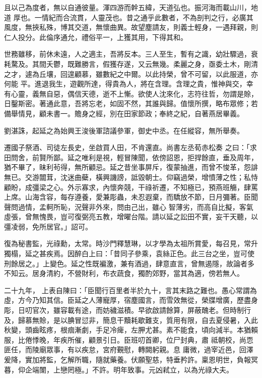 \begin{pinyinscope}
 且以己為度者，無以自通彼量。渾四游而幹五緯，天道弘也。振河海而載山川，地道
 厚也。一情紀而合流貫，人靈茂也。昔之通乎此數者，不為剖判之行，必廣其風度，無挾私殊，博其交道，無懷曲異。故望塵請友，則義士輕身，一遇拜親，則仁人投分。此倫序通允，禮俗平一，上獲其用，下得其和。



 世務雖移，前休未遠，人之適主，吾將反本。三人至生，暫有之識，幼壯驟過，衰耗騖及。其間夭鬱，既難勝言，假獲存遂，又云無幾。柔麗之身，亟委土木，剛清之才，遽為丘壤，回遑顧慕，雖數紀之中爾。以此持榮，曾不可留，以此服道，亦何能
 平。進退我生，遊觀所達，得貴為人，將在含理。含理之貴，惟神與交，幸有心靈，義無自惡，偶信天德，逝不上慚。欲使人沈來化，志符往哲，勿謂是賒，日鑿斯密。著通此意，吾將忘老，如固不然，其誰與歸。值懷所撰，略布眾修；若備舉情見，顧未書一。贍身之經，別在田家節政；奉終之紀，自著燕居畢義。



 劉湛誅，起延之為始興王浚後軍諮議參軍，御史中丞。在任縱容，無所舉奏。



 遷國子祭酒、司徒左長史，坐啟買人田，不肯還直。尚書左丞荀赤松奏
 之曰：「求田問舍，前賢所鄙。延之唯利是視，輕冒陳聞，依傍詔恩，拒捍餘直，垂及周年，猶不畢了，昧利茍得，無所顧忌。延之昔坐事屏斥，復蒙抽進，而曾不悛革，怨誹無已。交游闒茸，沈迷曲蘗，橫興譏謗，詆毀朝士。仰竊過榮，增憤薄之性；私恃顧盼，成彊梁之心。外示寡求，內懷奔競，干祿祈遷，不知極已，預燕班觴，肆罵上席。山海含容，每存遵養，愛兼彫蟲，未忍遐棄，而驕放不節，日月彌著。臣聞聲問過情，孟軻所恥，況聲非外來，問由己出，雖心
 智薄劣，而高自比擬，客氣虛張，曾無愧畏，豈可復弼亮五教，增曜台階。請以延之訟田不實，妄干天聽，以彊凌弱，免所居官。」詔可。



 復為秘書監，光祿勳，太常。時沙門釋慧琳，以才學為太祖所賞愛，每召見，常升獨榻，延之甚疾焉。因醉白上曰：「昔同子參乘，袁絲正色。此三台之坐，豈可使刑餘居之。」上變色。延之性既褊激，兼有酒過，肆意直言，曾無遏隱，故論者多不知云。居身清約，不營財利，布衣蔬食，獨酌郊野，當其為適，傍若無人。


二十九年，
 上表自陳曰：「臣聞行百里者半於九十，言其末路之難也。愚心常謂為虛，方今乃知其信。臣延之人薄寵厚，宿塵國言，而雪效無從，榮牒增廣，歷盡身彫，日叨官次，雖容載有途，而妨穢滋積。早欲啟請餘算，屏蔽醜老。但時制行及，歸慕無賒，是以腆冒愆非，簡息干黷耗歇難支，質用有限，自去夏侵暑，入此秋變，頭齒眩疼，根痼漸劇，手足冷痺，左胛尤甚。素不能食，頃向減半。本猶賴服，比倦悸晚，年疾所催，顧景引日。臣班叨首卿，位尸封典，肅
 祗朝校，尚恧匪任，而陵廟眾事，有以疾怠，宮府覲慰，轉闕躬親。息
 庸微，過宰近邑，回澤爰降，實加將監，乞解所職，隨就藥養。伏願聖慈，特垂矜許。稟恩明世，負報冥暮，仰企端闈，上戀罔極。」不許。明年致事。元凶弒立，以為光祿大夫。




\end{pinyinscope}
